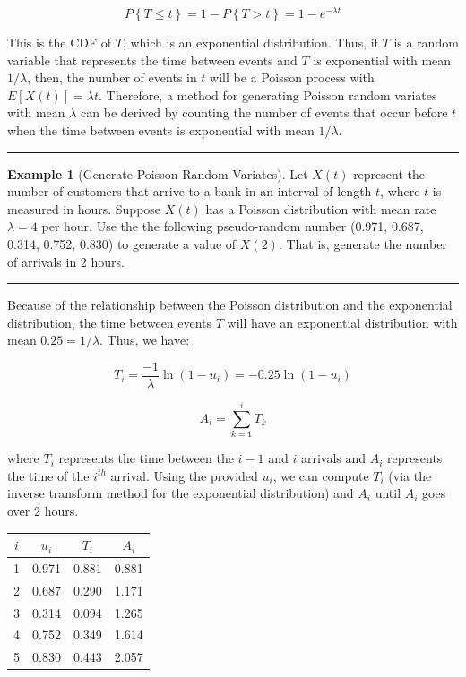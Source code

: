 \documentclass[
]{book}
\theoremstyle{definition}
\theoremstyle{definition}
\newtheorem{example}{Example}[chapter]
\theoremstyle{definition}
\theoremstyle{definition}
\theoremstyle{remark}
\begin{document}
\[
P\left\{T \le t\right\} = 1 - P\left\{T > t\right\} =  1 - e^{-\lambda t}
\]

This is the CDF of \(T\), which is an exponential distribution. Thus, if
\(T\) is a random variable that represents the time between events and \(T\)
is exponential with mean \(1/\lambda\), then, the number of events in \(t\)
will be a Poisson process with \(E\left[X(t)\right] = \lambda t\). Therefore, a
method for generating Poisson random variates with mean \(\lambda\) can be
derived by counting the number of events that occur before \(t\) when the
time between events is exponential with mean \(1/\lambda\).

\begin{center}\rule{0.5\linewidth}{0.5pt}\end{center}

\begin{example}[Generate Poisson Random Variates]
\protect\hypertarget{exm:GenPoissonRV}{}{\label{exm:GenPoissonRV} {} }Let \(X(t)\) represent the number of customers that arrive to a bank in an interval of length \(t\), where \(t\) is measured in hours. Suppose \(X(t)\) has a Poisson
distribution with mean rate \(\lambda = 4\) per hour. Use the the following pseudo-random number (0.971, 0.687, 0.314, 0.752, 0.830) to generate a value of \(X(2)\). That is, generate the number of arrivals in 2 hours.
\end{example}

\begin{center}\rule{0.5\linewidth}{0.5pt}\end{center}

Because of the relationship between the Poisson distribution and the
exponential distribution, the time between events \(T\) will have an
exponential distribution with mean \(0.25 = 1/\lambda\). Thus, we have:

\[T_i = \frac{-1}{\lambda}\ln (1-u_i) = -0.25\ln (1-u_i)\]

\[A_i = \sum\limits_{k=1}^{i} T_k\]

where \(T_i\) represents the time between the \(i-1\) and \(i\) arrivals and
\(A_i\) represents the time of the \(i^{th}\) arrival. Using the provided \(u_i\), we can compute \(T_i\) (via the inverse transform method for the exponential distribution) and \(A_i\) until \(A_i\) goes over 2 hours.

\begin{longtable}[]{@{}cccc@{}}
\toprule
\(i\) & \(u_i\) & \(T_i\) & \(A_i\) \\
\midrule
\endhead
1 & 0.971 & 0.881 & 0.881 \\
2 & 0.687 & 0.290 & 1.171 \\
3 & 0.314 & 0.094 & 1.265 \\
4 & 0.752 & 0.349 & 1.614 \\
5 & 0.830 & 0.443 & 2.057 \\
\bottomrule
\end{longtable}
\end{document}
